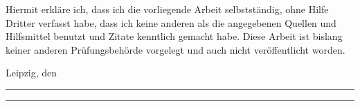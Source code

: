 \thispagestyle{empty}

Hiermit erkläre ich, dass ich die vorliegende Arbeit selbstständig, ohne Hilfe Dritter verfasst habe, dass ich keine anderen als die angegebenen Quellen und Hilfsmittel benutzt und Zitate kenntlich gemacht habe. Diese Arbeit ist bislang keiner anderen Prüfungsbehörde vorgelegt und auch nicht veröffentlicht worden.

\vspace{2cm}
Leipzig, den \rule[-1mm]{3cm}{.1pt}\hspace*{2cm}\rule[-1mm]{4cm}{.1pt}\\
\phantom{Leipzig, den }\hspace*{2cm}
\hspace*{4.1cm}{\small Unterschrift}

